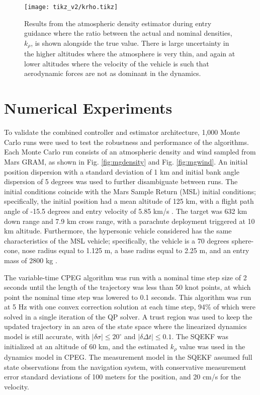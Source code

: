\begin{figure}
    \centering
    \texttt{[image: tikz\_v2/krho.tikz]}
    \caption{Results from the atmospheric density estimator during entry guidance where the ratio between the actual and nominal densities, $k_\rho$, is shown alongside the true value. There is large uncertainty in the higher altitudes where the atmosphere is very thin, and again at lower altitudes where the velocity of the vehicle is such that aerodynamic forces are not as dominant in the dynamics.}
    \label{fig:krho}
\end{figure}

\section{Numerical Experiments}\label{sec:cpeg2:section6}
To validate the combined controller and estimator architecture, 1,000 Monte Carlo runs were used to test the robustness and performance of the algorithms. Each Monte Carlo run consists of an atmospheric density and wind sampled from Mars GRAM, as shown in Fig. \ref{fig:mgdensity} and Fig. \ref{fig:mgwind}. An initial position dispersion with a standard deviation of 1 km and initial bank angle dispersion of 5 degrees was used to further disambiguate between runs. The initial conditions coincide with the Mars Sample Return (MSL) initial conditions; specifically, the initial position had a mean altitude of 125 km, with a flight path angle of -15.5 degrees and entry velocity of 5.85 km/s \cite{braun2006, way2007}. The target was 632 km down range and 7.9 km cross range, with a parachute deployment triggered at 10 km altitude. Furthermore, the hypersonic vehicle considered has the same characteristics of the MSL vehicle; specifically, the vehicle is a 70 degrees sphere-cone, nose radius equal to 1.125 m, a base radius equal to 2.25 m, and an entry mass of 2800 kg \cite{braun2006}.

The variable-time CPEG algorithm was run with a nominal time step size of 2 seconds until the length of the trajectory was less than 50 knot points, at which point the nominal time step was lowered to 0.1 seconds. This algorithm was run at 5 Hz with one convex correction solution at each time step, 94\% of which were solved in a single iteration of the QP solver. A trust region was used to keep the updated trajectory in an area of the state space where the linearized dynamics model is still accurate, with $|\delta \sigma | \leq 20 ^\circ$ and $|\delta \Delta t |\leq 0.1 $. The SQEKF was initialized at an altitude of 60 km, and the estimated $k_\rho$ value was used in the dynamics model in CPEG. The measurement model in the SQEKF assumed full state observations from the navigation system, with conservative measurement error standard deviations of 100 meters for the position, and 20 cm/s for the velocity. 

